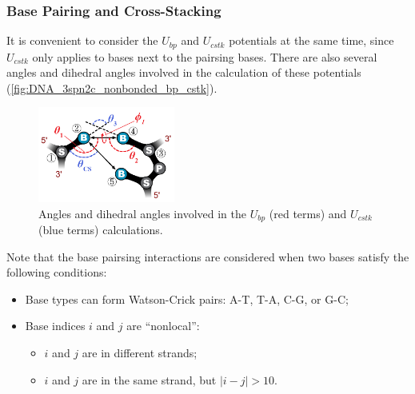 \subsubsection{Base Pairing and Cross-Stacking}
\label{sec:dna_3spn2c_potential_bp_cstk}

It is convenient to consider the $U_{bp}$ and $U_{cstk}$ potentials at the same
time, since $U_{cstk}$ only applies to bases next to the pairsing bases.  There
are also several angles and dihedral angles involved in the calculation of these
potentials (\autoref{fig:DNA_3spn2c_nonbonded_bp_cstk}).


\begin{figure}[ht]
  \centering
  \includegraphics[width=0.4\textwidth]{figures/DNA_3spn2c_nonbonded_bp_cstk.png}
  \caption{Angles and dihedral angles involved in the $U_{bp}$ (red terms) and
    $U_{cstk}$ (blue terms) calculations.}
  \label{fig:DNA_3spn2c_nonbonded_bp_cstk}
\end{figure}

Note that the base pairsing interactions are considered when two bases satisfy
the following conditions:
\begin{itemize}
\item Base types can form Watson-Crick pairs: A-T, T-A, C-G, or G-C;
\item Base indices $i$ and $j$ are ``nonlocal'':
  \begin{itemize}
  \item $i$ and $j$ are in different strands;
  \item $i$ and $j$ are in the same strand, but $| i - j | > 10$.
  \end{itemize}
\end{itemize}


